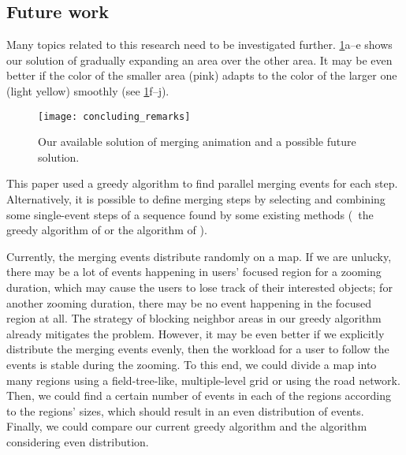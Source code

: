 \documentclass[]{interact}
\begin{document}
\subsection{Future work}

Many topics related to this research need to be investigated further.
\fig\ref{fig:smooth_merging}a--e shows our solution of
gradually expanding an area over the other area.
It may be even better if the color of the smaller area (pink)
adapts to the color of the larger one (light yellow) smoothly
(see \fig\ref{fig:smooth_merging}f--j).


\begin{figure}[tb]
\centering
\texttt{[image: concluding\_remarks]}
\caption{
    Our available solution of merging animation 
    and a possible future solution.}
\label{fig:smooth_merging}
\end{figure}







This paper used a greedy algorithm 
to find parallel merging events for each step.
Alternatively, it is possible to define merging steps 
by selecting and combining some single-event steps of a sequence found 
by some existing methods
(\eg~the greedy algorithm of \citet{vanOosterom2005}
or the \Astar algorithm of \citet[]{Peng2019Thesis}).

Currently, the merging events distribute randomly on a map.
If we are unlucky, there may be a lot of events 
happening in users' focused region for a zooming duration,
which may cause the users to lose track of their interested objects;
for another zooming duration, 
there may be no event happening in the focused region at all.
The strategy of blocking neighbor areas in our greedy algorithm 
already mitigates the problem.
However, it may be even better if 
we explicitly distribute the merging events evenly, 
then the workload for a user to follow the events is stable during the zooming.
To this end, we could divide a map into many regions 
using a field-tree-like, multiple-level grid \citep{vanPutten1998NewGAP}
or using the road network.
Then, we could find a certain number of events in each of the regions 
according to the regions' sizes,
which should result in an even distribution of events.
Finally, we could compare our current greedy algorithm and 
the algorithm considering even distribution.
\end{document}
